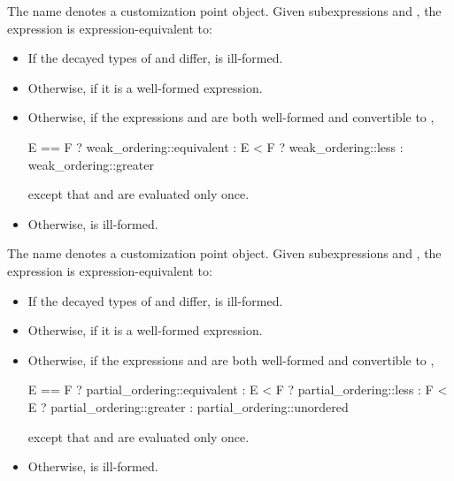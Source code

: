 %
\pnum
The name  denotes
a customization point object.
Given subexpressions  and ,
the expression 
is expression-equivalent to:
\begin{itemize}
\item
  If the decayed types of  and  differ,
   is ill-formed.
\item
  Otherwise,  if it is a well-formed expression.
\item
  Otherwise, if the expressions  and 
  are both well-formed and convertible to ,
\begin{codeblock}
E == F ? weak_ordering::equivalent :
E < F  ? weak_ordering::less :
         weak_ordering::greater
\end{codeblock}
except that  and  are evaluated only once.
\item
  Otherwise,  is ill-formed.
\end{itemize}

%
\pnum
The name  denotes
a customization point object.
Given subexpressions  and ,
the expression 
is expression-equivalent to:
\begin{itemize}
\item
  If the decayed types of  and  differ,
   is ill-formed.
\item
  Otherwise,  if it is a well-formed expression.
\item
  Otherwise, if the expressions  and 
  are both well-formed and convertible to ,
\begin{codeblock}
E == F ? partial_ordering::equivalent :
E < F  ? partial_ordering::less :
F < E  ? partial_ordering::greater :
         partial_ordering::unordered
\end{codeblock}
except that  and  are evaluated only once.
\item
  Otherwise,  is ill-formed.
\end{itemize}

